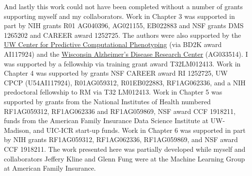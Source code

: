 \begin{acks}
And lastly this work could not have been completed
without a number of grants supporting
myself and my collaborators.
Work in Chapter 3 was supported in part by NIH grants R01 AG040396, AG021155, EB022883 
and NSF grants DMS 1265202 and CAREER award 1252725.
The authors were also supported by the \href{http://cpcp.wisc.edu/}{UW Center for Predictive Computational Phenotyping} (via BD2K award AI117924) and the \href{http://www.adrc.wisc.edu/}{Wisconsin Alzheimer's Disease Research Center} (AG033514). 
I was supported by a fellowship via training grant award T32LM012413.
Work in Chapter 4 was supported by grants NSF CAREER award RI 1252725, UW CPCP (U54AI117924), R01AG059312, R01EB022883, RF1AG062336, 
and a NIH predoctoral fellowship to RM via T32 LM012413.
Work in Chapter 5 was supported by grants from the National Institutes of Health numbered RF1AG059312, RF1AG062336 and RF1AG059869, NSF award CCF 1918211, funds from the American Family Insurance Data Science Institute at UW-Madison, and UIC-ICR start-up funds.
Work in Chapter 6 was supported in part by NIH grants RF1AG059312, RF1AG062336, RF1AG059869, and NSF award CCF 1918211.
The work presented here was partially developed while myself and collaborators Jeffery Kline and Glenn Fung were at the Machine Learning Group at American Family Insurance.

\end{acks}
